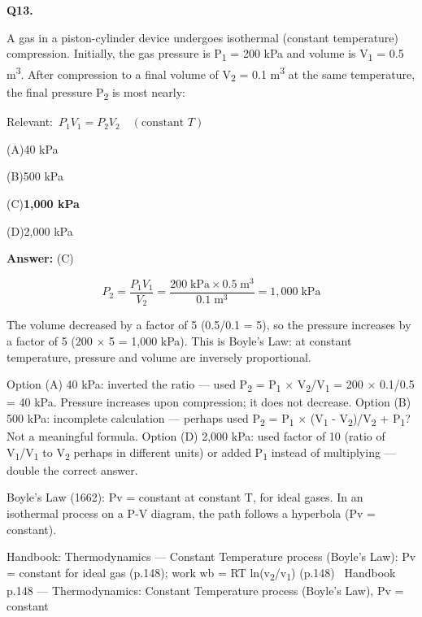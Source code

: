 \documentclass[11pt]{article}
\newcommand{\correct}[1]{\textbf{#1}\;{\color{accent}$\checkmark$}}
\newcommand{\optline}[2]{\par\noindent\hspace{1.2em}(#1)\hspace{0.6em}#2}
\begin{document}
\vspace{9pt}
\filbreak
\textbf{\color{accent}Q13.}\par\vspace{2pt}
A gas in a piston-cylinder device undergoes isothermal (constant temperature) compression. Initially, the gas pressure is P\textsubscript{1} = 200 kPa and volume is V\textsubscript{1} = 0.5 m\textsuperscript{3}. After compression to a final volume of V\textsubscript{2} = 0.1 m\textsuperscript{3} at the same temperature, the final pressure P\textsubscript{2} is most nearly:\par\vspace{3pt}
{\small\color{soft}Relevant:}\ $P_1 V_1 = P_2 V_2 \quad (\text{constant } T)$\par\vspace{3pt}
\optline{A}{40 kPa}
\optline{B}{500 kPa}
\optline{C}{\correct{1,000 kPa}}
\optline{D}{2,000 kPa}
\par\vspace{3pt}
\vspace{2pt}\par\noindent\colorbox{boxbg}{\parbox{\dimexpr\linewidth-2\fboxsep\relax}{%
\vspace{2pt}\textbf{Answer:} (C)\par\vspace{2pt}
{\small \[P_2 = \frac{P_1 V_1}{V_2} = \frac{200\;\text{kPa} \times 0.5\;\text{m}^3}{0.1\;\text{m}^3} = 1{,}000\;\text{kPa}\]

The volume decreased by a factor of 5 (0.5/0.1 = 5), so the pressure increases by a factor of 5 (200 $\times$ 5 = 1,000 kPa). This is Boyle's Law: at constant temperature, pressure and volume are inversely proportional.

Option (A) 40 kPa: inverted the ratio --- used P\textsubscript{2} = P\textsubscript{1} $\times$ V\textsubscript{2}/V\textsubscript{1} = 200 $\times$ 0.1/0.5 = 40 kPa. Pressure increases upon compression; it does not decrease. Option (B) 500 kPa: incomplete calculation --- perhaps used P\textsubscript{2} = P\textsubscript{1} $\times$ (V\textsubscript{1} - V\textsubscript{2})/V\textsubscript{2} + P\textsubscript{1}? Not a meaningful formula. Option (D) 2,000 kPa: used factor of 10 (ratio of V\textsubscript{1}/V\textsubscript{1} to V\textsubscript{2} perhaps in different units) or added P\textsubscript{1} instead of multiplying --- double the correct answer.

Boyle's Law (1662): Pv = constant at constant T, for ideal gases. In an isothermal process on a P-V diagram, the path follows a hyperbola (Pv = constant).}\par\vspace{2pt}
{\footnotesize\color{soft}Handbook: Thermodynamics --- Constant Temperature process (Boyle's Law): Pv = constant for ideal gas (p.148); work wb = RT ln(v\textsubscript{2}/v\textsubscript{1}) (p.148) \textbullet\ Handbook p.148 --- Thermodynamics: Constant Temperature process (Boyle's Law), Pv = constant}\vspace{2pt}
}}
\end{document}
